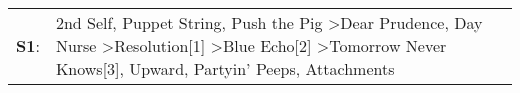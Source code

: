 \begin{supertabular}{p{0.03\textwidth}p{0.92\textwidth}}
 \textbf{S1}:  &  2nd Self\textsuperscript{}, \enspace Puppet String\textsuperscript{}, \enspace Push the Pig\textsuperscript{} \textgreater \enspace Dear Prudence\textsuperscript{}, \enspace Day Nurse\textsuperscript{} \textgreater \enspace Resolution[1]\textsuperscript{} \textgreater \enspace Blue Echo[2]\textsuperscript{} \textgreater \enspace Tomorrow Never Knows[3]\textsuperscript{}, \enspace Upward\textsuperscript{}, \enspace Partyin' Peeps\textsuperscript{}, \enspace Attachments\textsuperscript{}  \enspace  \\
\end{supertabular}
